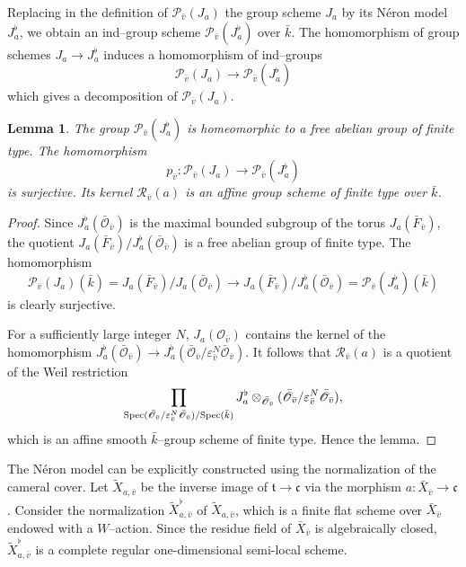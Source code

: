 \documentclass[12pt,english]{smfart}
\numberwithin{equation}{subsection}
\newtheorem{lemma}[equation]{Lemma}
\theoremstyle{remark}
\newcommand\calP{{\mathscr P}}
\newcommand\calR{{\mathscr R}}
\newcommand\calO{{\mathscr O}}
\newcommand\Spec{{\rm Spec}}
\begin{document}
Replacing in the definition of $\calP_{\bar v}(J_a)$ the group scheme $J_a$ by its N\'eron model $J_a^\flat$, we obtain an ind--group scheme $\calP_{\bar v}(J_a^\flat)$ over $\bar{k}$. The homomorphism of group schemes $J_a\to J_a^\flat$ induces a homomorphism of ind--groups
$$\calP_{\bar v}(J_a)\to \calP_{\bar v}(J_a^\flat)$$
which gives a decomposition of $\calP_{\bar v}(J_a)$.

\begin{lemma}\label{R_v(a)}
The group $\calP_{\bar v}(J_a^\flat)$ is homeomorphic to a free abelian group of finite type. The homomorphism
$$
p_{\bar v}:\calP_{\bar v}(J_a)\to \calP_{\bar v}(J_a^\flat)
$$
is surjective. Its kernel $\calR_{\bar v}(a)$ is an affine group scheme of finite type over $\bar{k}$.
\end{lemma}

\begin{proof}
Since $J_a^\flat(\bar\calO_{\bar v})$ is the maximal bounded subgroup of the torus $J_a(\bar F_{\bar v})$, the quotient $J_a(\bar F_{\bar v})/J_a^\flat(\bar\calO_{\bar v})$ is a free abelian group of finite type. The homomorphism
$$
\calP_{\bar v}(J_a)(\bar{k}) = J_a(\bar F_{\bar v})/J_a(\bar\calO_{\bar v}) \to J_a(\bar F_{\bar v})/J_a^\flat(\bar\calO_{\bar v}) = \calP_{\bar v}(J_a^\flat)(\bar{k})
$$
is clearly surjective.

For a sufficiently large integer $N$, $J_a(\calO_{\bar v})$ contains the kernel of the homomorphism $J_a^\flat(\bar\calO_{\bar v}) \to J_a^\flat(\bar\calO_{\bar v}/\varepsilon_{\bar v}^N\bar\calO_{\bar v})$. It follows that $\calR_{\bar v}(a)$ is a quotient of the Weil restriction
$$
\prod_{\Spec(\bar\calO_{\bar v}/\varepsilon_{\bar v}^N\bar\calO_{\bar v})/\Spec(\bar{k})} J_a^\flat\otimes_{\bar\calO_{\bar v}} (\bar\calO_{\bar v}/\varepsilon_{\bar v}^N\bar\calO_{\bar v}),
$$
which is an affine smooth $\bar{k}$--group scheme of finite type. Hence the lemma.
\end{proof}

The N\'eron model can be explicitly constructed using the normalization of the cameral cover. Let $\widetilde X_{a,\bar v}$ be the inverse image of $\mathfrak{t}\to\mathfrak{c}$ via the morphism $a:\bar X_{\bar v}\to \mathfrak{c}$. Consider the normalization $\widetilde X_{a,\bar v}^\flat$ of $\widetilde X_{a,\bar v}$, which is a finite flat scheme over $\bar X_{\bar v}$ endowed with a $W$--action. Since the residue field of $\bar X_{\bar v}$ is algebraically closed, $\widetilde X_{a,\bar v}^\flat$ is a complete regular one-dimensional semi-local scheme.
\end{document}
